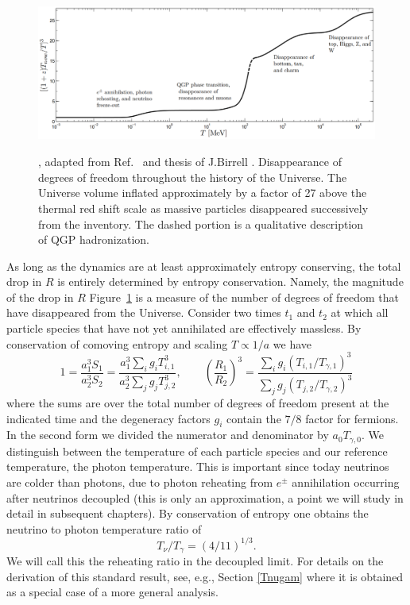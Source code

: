 \begin{figure} 
\centerline{\includegraphics[height=5.2cm]{01-introduction/Figures/degrees_of_freedom.PNG}}
\caption{, adapted from Ref.~\cite{Rafelski:2013yka} and thesis of J.Birrell \cite{Birrell:2014ona}. Disappearance of degrees of freedom throughout the history of the Universe. The Universe volume inflated approximately by a factor of 27 above the thermal red shift scale as massive particles disappeared successively from the inventory. The dashed portion is a qualitative description
of QGP hadronization.\label{fig:dof}}
 \end{figure}



As long as the dynamics are at least approximately entropy conserving, the total drop in $R$ is entirely determined by entropy conservation. Namely, the magnitude of the drop in $R$ Figure~\ref{fig:dof} is a measure of the number of degrees of freedom that have disappeared from the Universe. Consider two times $t_1$ and $t_2$ at which all particle species that have not yet annihilated are effectively massless. By conservation of comoving entropy and scaling $T\propto 1/a$ we have
\begin{equation}\label{r_ratio}
1=\frac{a_1^3S_{1}}{a_2^3 S_2}=\frac{a_1^3\sum_ig_i T_{i,1}^3}{a_2^3\sum_j g_j T_{j,2}^3},\qquad \left(\frac{R_1}{R_2}\right)^3=\frac{\sum_ig_i (T_{i,1}/T_{\gamma,1})^3}{\sum_j g_j (T_{j,2}/T_{\gamma,2})^3}
\end{equation}
where the sums are over the total number of degrees of freedom present at the indicated time and the degeneracy factors $g_i$ contain the $7/8$ factor for fermions. In the second form we divided the numerator and denominator by $a_{0}T_{\gamma,0}$. We distinguish between the temperature of each particle species and our reference temperature, the photon temperature. This is important since today neutrinos are colder than photons, due to photon reheating from $e^\pm$ annihilation occurring after neutrinos decoupled (this is only an approximation, a point we will study in detail in subsequent chapters). By conservation of entropy one obtains the neutrino to photon temperature ratio of
\begin{equation}\label{T_nu_T_gamma}
T_\nu/T_\gamma=({4}/{11})^{1/3}.
\end{equation}
We will call this the reheating ratio in the decoupled limit. For details on the derivation of this standard result, see, e.g., Section \ref{Tnugam} where it is obtained as a special case of a more general analysis.

